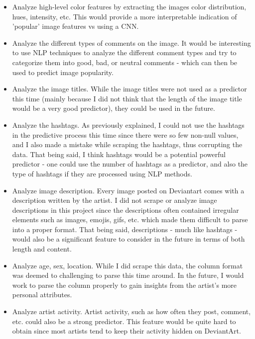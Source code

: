 \documentclass[11pt]{article}
\begin{document}
\begin{itemize}
\item
  Analyze high-level color features by extracting the images color
  distribution, hues, intensity, etc. This would provide a more
  interpretable indication of 'popular' image features vs using a CNN.
\item
  Analyze the different types of comments on the image. It would be
  interesting to use NLP techniques to analyze the different comment
  types and try to categorize them into good, bad, or neutral comments -
  which can then be used to predict image popularity.
\item
  Analyze the image titles. While the image titles were not used as a
  predictor this time (mainly because I did not think that the length of
  the image title would be a very good predictor), they could be used in
  the future.
\item
  Analyze the hashtags. As previously explained, I could not use the
  hashtags in the predictive process this time since there were so few
  non-null values, and I also made a mistake while scraping the
  hashtags, thus corrupting the data. That being said, I think hashtags
  would be a potential powerful predictor - one could use the number of
  hashtags as a predictor, and also the type of hashtags if they are
  processed using NLP methods.
\item
  Analyze image description. Every image posted on Deviantart comes with
  a description written by the artist. I did not scrape or analyze image
  descriptions in this project since the descriptions often contained
  irregular elements such as images, emojis, gifs, etc. which made them
  difficult to parse into a proper format. That being said, descriptions
  - much like hashtags - would also be a significant feature to consider
  in the future in terms of both length and content.
\item
  Analyze age, sex, location. While I did scrape this data, the column
  format was deemed to challenging to parse this time around. In the
  future, I would work to parse the column properly to gain insights
  from the artist's more personal attributes.
\item
  Analyze artist activity. Artist activity, such as how often they post,
  comment, etc. could also be a strong predictor. This feature would be
  quite hard to obtain since most artists tend to keep their activity
  hidden on DeviantArt.
\end{itemize}
\newpage
\end{document}
